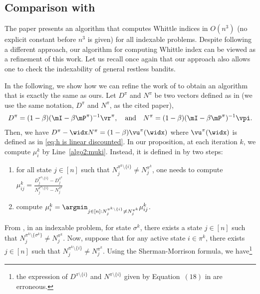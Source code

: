 \subsection{Comparison with \texorpdfstring{\cite{akbarzadeh2020conditions}}{Akbarzadeh2020 et al. 2022}}
The paper presents an  algorithm that computes Whittle indices  in $O(n^3)$ (no explicit constant before $n^3$ is given) for all indexable problems. Despite following a different approach, our algorithm for computing Whittle index can be viewed as a refinement of this work. Let us recall once again that our approach also allows one to check the indexability of general restless bandits.

In the following, we show how we can refine the work of \cite{akbarzadeh2020conditions} to obtain an algorithm that is exactly the same as ours.
Let $D^{\pi}$ and $N^{\pi}$ be two vectors defined as in \cite{akbarzadeh2020conditions} (we use the same notation,  $D^{\pi}$ and $N^{\pi}$, as the cited paper),
\begin{align*}
    D^{\pi} =(1-\beta)(\mI-\beta \mP^\pi)^{-1}\vr^{\pi}, \quad\text{and}\quad
    N^{\pi} =(1-\beta)(\mI-\beta \mP^\pi)^{-1}\vpi.
\end{align*}
Then, we have $D^{\pi} -\widx N^{\pi}=(1-\beta)\vu^{\pi}(\widx)$ where $\vu^{\pi}(\widx)$ is defined as in \eqref{eq:h is linear discounted}. In our proposition, at each iteration $k$, we compute $\mu_i^k$ by Line~\ref{algo2:muki}. Instead, it is defined in \cite{akbarzadeh2020conditions} by two steps:
\begin{enumerate}
\item for all state $j\in[n]$ such that $N_j^{\pi^k\setminus\{i\}}{\neq} N_j^{\pi^k}$, one needs to compute $\mu^k_{ij}{=}\displaystyle\frac{D_j^{\pi^k\setminus\{i\}} -D_j^{\pi^k}}{ N_j^{\pi^k\setminus\{i\}} -N_j^{\pi^k}}$ 
\item \label{it:mu^k_i*} compute $\mu^k_i=\displaystyle\argmin_{j\in[n]:N_j^{\pi^k\setminus\{i\}}\neq N_j^{\pi^k}} \mu^k_{ij}$.
\end{enumerate}
From \cite[Theorem 2]{akbarzadeh2020conditions}, in an indexable problem, for state $\sigma^k$, there exists a state $j\in[n]$ such that $N_j^{\pi^k\setminus\{\sigma^k\}}\neq N_j^{\pi^k}$. Now, suppose that for any active state $i\in\pi^k$, there exists $j\in[n]$ such that $N_j^{\pi^k\setminus\{i\}}\neq N_j^{\pi^k}$. Using the Sherman-Morrison formula, we have\footnote{the expression of $D^{\pi\setminus\{i\}}$ and $N^{\pi\setminus\{i\}}$ given by Equation~$(18)$ in \cite{akbarzadeh2020conditions} are erroneous.}
